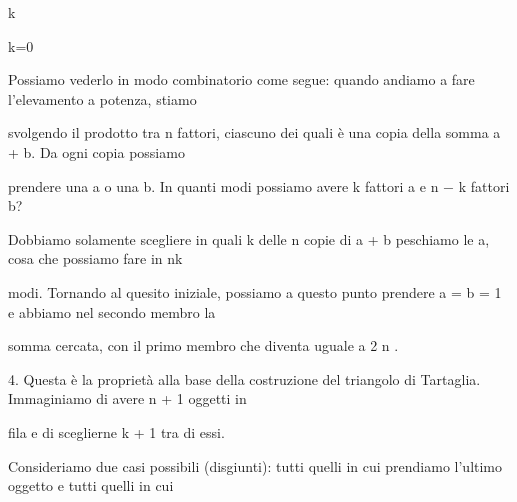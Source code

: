 \documentclass[a4paper,portrait,12pt]{article}
\begin{document}
\begin{flushleft}
k
\end{flushleft}


\begin{flushleft}
k=0
\end{flushleft}





\begin{flushleft}
Possiamo vederlo in modo combinatorio come segue: quando andiamo a fare l'elevamento a potenza, stiamo
\end{flushleft}


\begin{flushleft}
svolgendo il prodotto tra n fattori, ciascuno dei quali \`{e} una copia della somma a + b. Da ogni copia possiamo
\end{flushleft}


\begin{flushleft}
prendere una a o una b. In quanti modi possiamo avere k fattori a e n $-$ k fattori b?
\end{flushleft}


\begin{flushleft}
Dobbiamo solamente scegliere in quali k delle n copie di a + b peschiamo le a, cosa che possiamo fare in nk
\end{flushleft}


\begin{flushleft}
modi. Tornando al quesito iniziale, possiamo a questo punto prendere a = b = 1 e abbiamo nel secondo membro la
\end{flushleft}


\begin{flushleft}
somma cercata, con il primo membro che diventa uguale a 2 n .
\end{flushleft}


\begin{flushleft}
4. Questa \`{e} la propriet\`{a} alla base della costruzione del triangolo di Tartaglia. Immaginiamo di avere n + 1 oggetti in
\end{flushleft}


\begin{flushleft}
fila e di sceglierne k + 1 tra di essi.
\end{flushleft}


\begin{flushleft}
Consideriamo due casi possibili (disgiunti): tutti quelli in cui prendiamo l'ultimo oggetto e tutti quelli in cui
\end{flushleft}
\end{document}
